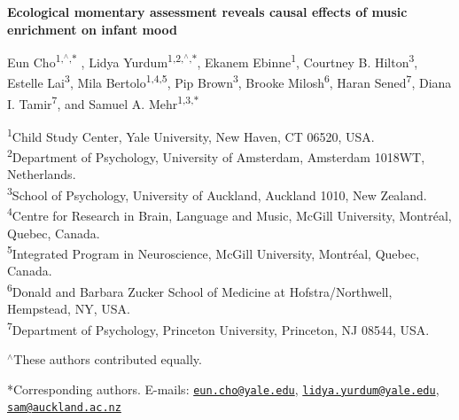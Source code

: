 \documentclass[
]{article}
\author{}
\date{\vspace{-2.5em}}
\begin{document}
\raggedright
\LARGE

\textbf{Ecological momentary assessment reveals causal effects of music enrichment on infant mood}

\vspace{0.1in}

\justifying
\normalsize

Eun Cho\textsuperscript{1,\(^{\wedge}\),\(\ast\)} , Lidya
Yurdum\textsuperscript{1,2,\(^{\wedge}\),\(\ast\)}, Ekanem
Ebinne\textsuperscript{1}, Courtney B. Hilton\textsuperscript{3},
Estelle Lai\textsuperscript{3}, Mila Bertolo\textsuperscript{1,4,5}, Pip
Brown\textsuperscript{3}, Brooke Milosh\textsuperscript{6}, Haran
Sened\textsuperscript{7}, Diana I. Tamir\textsuperscript{7}, and Samuel
A. Mehr\textsuperscript{1,3,\(\ast\)}

\small

\textsuperscript{1}Child Study Center, Yale University, New Haven, CT
06520, USA.\\
\textsuperscript{2}Department of Psychology, University of Amsterdam,
Amsterdam 1018WT, Netherlands.\\
\textsuperscript{3}School of Psychology, University of Auckland,
Auckland 1010, New Zealand.\\
\textsuperscript{4}Centre for Research in Brain, Language and Music,
McGill University, Montréal, Quebec, Canada.\\
\textsuperscript{5}Integrated Program in Neuroscience, McGill
University, Montréal, Quebec, Canada.\\
\textsuperscript{6}Donald and Barbara Zucker School of Medicine at
Hofstra/Northwell, Hempstead, NY, USA.\\
\textsuperscript{7}Department of Psychology, Princeton University,
Princeton, NJ 08544, USA.

\(^{\wedge}\)These authors contributed equally.

*Corresponding authors. E-mails:
\href{mailto:eun.cho@yale.edu}{\nolinkurl{eun.cho@yale.edu}},
\href{mailto:lidya.yurdum@yale.edu}{\nolinkurl{lidya.yurdum@yale.edu}},
\href{mailto:sam@auckland.ac.nz}{\nolinkurl{sam@auckland.ac.nz}}

\bigskip
\end{document}
